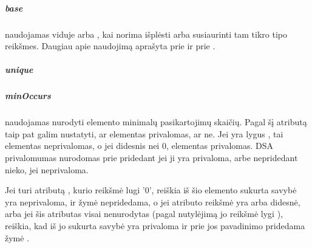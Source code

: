 \documentclass[letterpaper,10pt,lithuanian]{sphinxmanual}
\begin{document}
\subparagraph{base}
\label{\detokenize{schemos/xsd:base}}\label{\detokenize{schemos/xsd:xsd-base}}
\sphinxAtStartPar
{} naudojamas viduje {\hyperref[\detokenize{schemos/xsd:xsd-extension}]{}} arba {\hyperref[\detokenize{schemos/xsd:xsd-restriction}]{}}, kai norima išplėsti arba
susiaurinti tam tikro tipo reikšmes. Daugiau apie  naudojimą aprašyta prie
{\hyperref[\detokenize{schemos/xsd:xsd-complex-content}]{}} ir prie {\hyperref[\detokenize{schemos/xsd:xsd-simple-content}]{}}.


\subparagraph{unique}
\label{\detokenize{schemos/xsd:unique}}\label{\detokenize{schemos/xsd:xsd-unique}}

\subparagraph{minOccurs}
\label{\detokenize{schemos/xsd:minoccurs}}\label{\detokenize{schemos/xsd:xsd-minoccurs}}
\sphinxAtStartPar
{} naudojamas nurodyti elemento minimalų pasikartojimų skaičių. Pagal šį atributą taip pat
galim nustatyti, ar elementas privalomas, ar ne. Jei  yra lygus , tai elementas
neprivalomas, o jei didesnis nei 0, elementas privalomas. DSA privalomumas nurodomas prie
 pridedant  jei ji yra privaloma, arbe nepridedant nieko, jei neprivaloma.

\sphinxAtStartPar
Jei {\hyperref[\detokenize{schemos/xsd:xsd-element}]{}} turi atributą , kurio reikšmė lugi '0', reiškia iš šio elemento
sukurta savybė yra neprivaloma, ir žymė  nepridedama, o jei  atributo reikšmė
yra  arba didesnė, arba jei šis atributas visai nenurodytas (pagal nutylėjimą jo reikšmė lygi ),
reiškia, kad iš jo sukurta savybė yra privaloma ir prie jos pavadinimo pridedama žymė .
\end{document}
